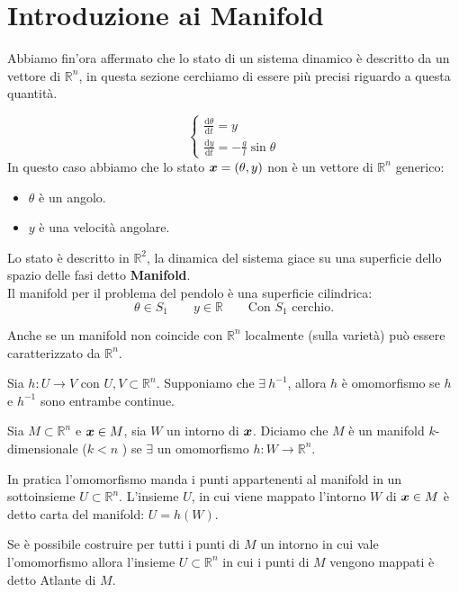\section{Introduzione ai Manifold}%
\label{sub:Introduzione ai Manifold}
Abbiamo fin'ora affermato che lo stato di un sistema dinamico è descritto da un vettore di $\mathbb{R}^n$, in questa sezione cerchiamo di essere più precisi riguardo a questa quantità.
\begin{exmp}
    \[
        \begin{cases}
            \frac{\text{d} \theta}{\text{d} t} = y\\
	    \frac{\text{d} y}{\text{d} t} = -\frac{g}{l}\sin\theta
        \end{cases}
    \] 
    In questo caso abbiamo che lo stato $\boldsymbol{x} = (\theta, y)$ non è un vettore di $\mathbb{R}^n$ generico: 
    \begin{itemize}
        \item $\theta$ è un angolo. 
	\item $y$ è una velocità angolare.
    \end{itemize}
    Lo stato è descritto in $\mathbb{R}^2$, la dinamica del sistema giace su una superficie dello spazio delle fasi detto \textbf{Manifold}.\\
    Il manifold per il problema del pendolo è una superficie cilindrica:
    \[
        \theta\in S_1 \qquad y \in \mathbb{R}\qquad \text{Con $S_1$ cerchio}
    .\] 
\end{exmp}
\noindent
Anche se un manifold non coincide con $\mathbb{R}^n$ localmente (sulla varietà) può essere caratterizzato da $\mathbb{R}^n$.
\begin{defn}[Omomorfismo]
    Sia $h: U\to V$ con $U, V \subset \mathbb{R}^n$. Supponiamo che $\exists \ h^{-1}$, allora $h$ è omomorfismo se $h$ e $h^{-1}$ sono entrambe continue.
\end{defn}
\noindent
\begin{defn}
    Sia $M\subset \mathbb{R}^n$ e $\boldsymbol{x}  \in M$, sia $W$ un intorno di $\boldsymbol{x}$. Diciamo che $M$ è un manifold $k$-dimensionale ($k<n$ ) se $\exists$ un omomorfismo $h: W\to \mathbb{R}^n$.
\end{defn}
\noindent
In pratica l'omomorfismo manda i punti appartenenti al manifold in un sottoinsieme $U \subset \mathbb{R}^n$. L'insieme $U$, in cui viene mappato l'intorno $W$ di $\boldsymbol{x}\in M$ è detto carta del manifold: $U = h(W)$.\\
\begin{defn}
Se è possibile costruire per tutti i punti di $M$ un intorno in cui vale l'omomorfismo allora l'insieme $U \subset \mathbb{R}^n$ in cui i punti di $M$ vengono mappati è detto Atlante di $M$.
\end{defn}
